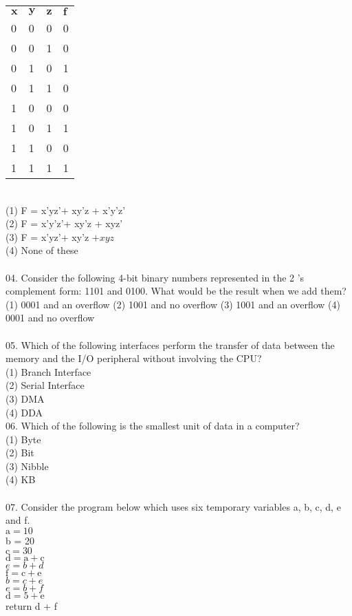 \documentclass[10pt]{article}
\begin{document}
\begin{center}
\begin{tabular}{llll}
$\mathbf{x}$ & $\mathbf{y}$ & $\mathbf{z}$ & $\mathbf{f}$ \\
0 & 0 & 0 & 0 \\
0 & 0 & 1 & 0 \\
0 & 1 & 0 & 1 \\
0 & 1 & 1 & 0 \\
1 & 0 & 0 & 0 \\
1 & 0 & 1 & 1 \\
1 & 1 & 0 & 0 \\
1 & 1 & 1 & 1 \\
\end{tabular}
\end{center}
\\
(1) F = x'yz'+ xy'z + x'y'z'\\
(2) F = x'y'z'+ xy'z + xyz'\\
(3) F = x'yz'+ xy'z $+x y z$\\
(4) None of these\\
\\
04. Consider the following 4-bit binary numbers represented in the 2 's complement form: 1101 and 0100. What would be the result when we add them?\\
(1) 0001 and an overflow (2) 1001 and no overflow (3) 1001 and an overflow (4) 0001 and no overflow\\
\\
05. Which of the following interfaces perform the transfer of data between the memory and the I/O peripheral without involving the CPU?\\
(1) Branch Interface\\
(2) Serial Interface\\
(3) DMA\\
(4) DDA\\
06. Which of the following is the smallest unit of data in a computer?\\
(1) Byte\\
(2) Bit\\
(3) Nibble\\
(4) KB\\
\\
07. Consider the program below which uses six temporary variables a, b, c, d, e and f.\\
$\mathrm{a}=10$\\
b = 20\\
$\mathrm{c}=30$\\
$\mathrm{d}=\mathrm{a}+\mathrm{c}$\\
$e=b+d$\\
$\mathrm{f}=\mathrm{c}+\mathrm{e}$\\
$b=c+e$\\
$e=b+f$\\
$\mathrm{d}=5+\mathrm{e}$\\
return d + f
\end{document}
